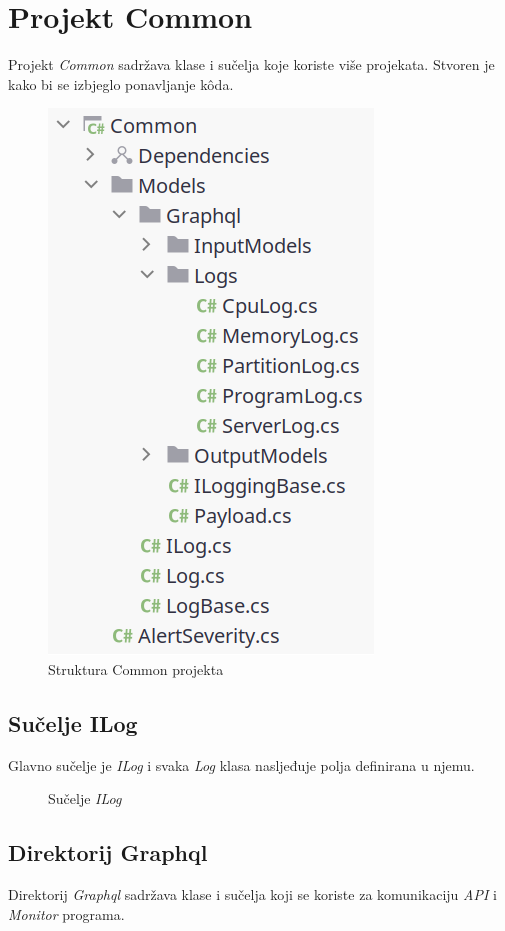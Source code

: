 \documentclass[zavrsnirad]{fer}
\begin{document}
\chapter{Projekt Common}
Projekt \textit{Common} sadržava klase i sučelja koje koriste više projekata. Stvoren je kako bi se izbjeglo ponavljanje kôda.
\begin{figure}[htb!]
	\centering
	\includegraphics[width=0.4\linewidth]{images/common_structure.png} 
	\caption{Struktura Common projekta}
	\label{slk:common_structure.png}
\end{figure}
\FloatBarrier

\section{Sučelje ILog}
Glavno sučelje je \textit{ILog} i svaka \textit{Log} klasa nasljeđuje polja definirana u njemu.
\begin{figure}[htb]
	\centering
	
	\caption{Sučelje \textit{ILog}}
\end{figure}
\FloatBarrier

\section{Direktorij Graphql}
Direktorij \textit{Graphql} sadržava klase i sučelja koji se koriste za komunikaciju \textit{API} i \textit{Monitor} programa.
\end{document}
